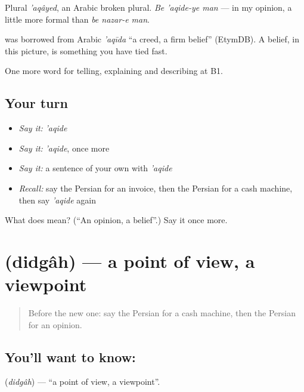 Plural \emph{'aqâyed}, an Arabic broken plural. \emph{Be 'aqide-ye man} — in my opinion, a little more formal than \emph{be nazar-e man}.

\begin{cousinweb}
\textbf{} was borrowed from Arabic \emph{'aqīda} \textquotedblleft{}a creed, a firm belief\textquotedblright{} (EtymDB). A belief, in this picture, is something you have tied fast.
\end{cousinweb}

\begin{grammarlens}[title={What you've built}]
One more word for telling, explaining and describing at B1.
\end{grammarlens}

\subsection*{Your turn}
\begin{itemize}
\raggedright
  \item \emph{Say it:} \emph{'aqide}
  \item \emph{Say it:} \emph{'aqide}, once more
  \item \emph{Say it:} a sentence of your own with \emph{'aqide}
  \item \emph{Recall:} say the Persian for an invoice, then the Persian for a cash machine, then say \emph{'aqide} again
\end{itemize}

\begin{tcolorbox}[breakable,colback=teal!4,colframe=teal!35!black,title={Before you move on}]
What does  mean? (\textquotedblleft{}An opinion, a belief\textquotedblright{}.) Say it once more.
\end{tcolorbox}
\section[\texorpdfstring{\fa{دیدگاه} (didgâh)}{دیدگاه (didgâh)}]{ (didgâh) — a point of view, a viewpoint}

\label{lesson:FA-C360-didgah}



\begin{quote}
Before the new one: say the Persian for a cash machine, then the Persian for an opinion.
\end{quote}

\subsection*{You'll want to know: }
\textbf{} (\emph{didgâh}) — \textquotedblleft{}a point of view, a viewpoint\textquotedblright{}.

